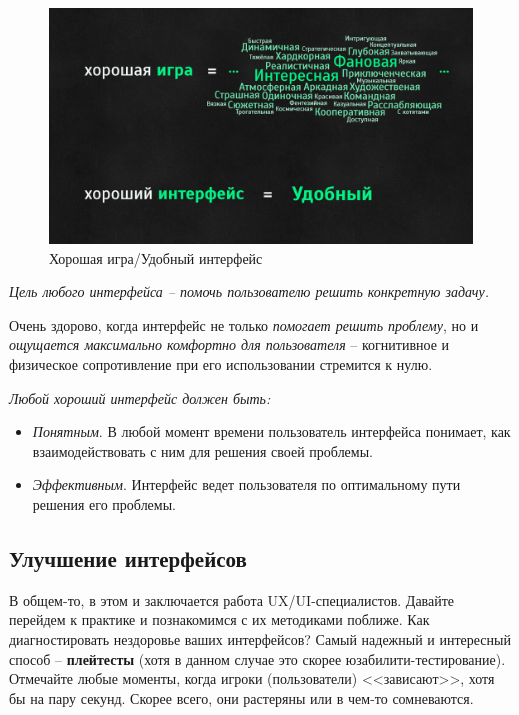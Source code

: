 \documentclass{article}
\begin{document}
\begin{figure}[H]
  \includegraphics[width=\textwidth]{res/img/goodGame.png}
  \caption{Хорошая игра/Удобный интерфейс}
\end{figure}

\textit{Цель любого интерфейса – помочь пользователю решить конкретную задачу.}

Очень здорово, когда интерфейс не только \textit{помогает решить проблему}, но и \textit{ощущается максимально комфортно для пользователя} -- когнитивное и физическое сопротивление при его использовании стремится к нулю.

\bigskip

\noindent\textit{Любой хороший интерфейс должен быть:}
\begin{itemize}
  \item \textit{Понятным}. В любой момент времени пользователь интерфейса понимает, как взаимодействовать с ним для решения своей проблемы.
  \item \textit{Эффективным}. Интерфейс ведет пользователя по оптимальному пути решения его проблемы.
\end{itemize}

\subsection{Улучшение интерфейсов}
В общем-то, в этом и заключается работа UX/UI-специалистов. Давайте перейдем к практике и познакомимся с их методиками поближе. Как диагностировать нездоровье ваших интерфейсов? Самый надежный и интересный способ -- \textbf{плейтесты} (хотя в данном случае это скорее юзабилити-тестирование). Отмечайте любые моменты, когда игроки (пользователи) <<зависают>>, хотя бы на пару секунд. Скорее всего, они растеряны или в чем-то сомневаются.
\end{document}
